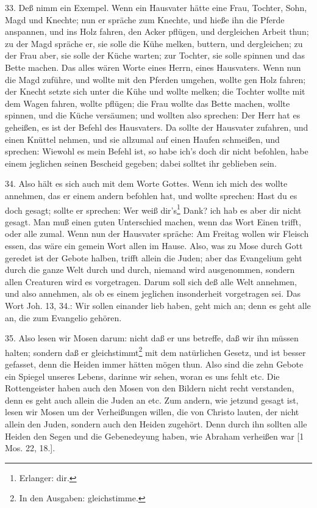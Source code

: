 33. Deß nimm ein Exempel. Wenn ein Hausvater hätte eine Frau, Tochter, Sohn, Magd und Knechte; nun er spräche zum Knechte, und hieße ihn die Pferde anspannen, und ins Holz fahren, den Acker pflügen, und dergleichen Arbeit thun; zu der Magd spräche er, sie solle die Kühe melken, buttern, und dergleichen; zu der Frau aber, sie solle der Küche warten; zur Tochter, sie solle spinnen und das Bette machen. Das alles wären Worte eines Herrn, eines Hausvaters. Wenn nun die Magd zuführe, und wollte mit den Pferden umgehen, wollte gen Holz fahren; der Knecht setzte sich unter die Kühe und wollte melken; die Tochter wollte mit dem Wagen fahren, wollte pflügen; die Frau wollte das Bette machen, wollte spinnen, und die Küche versäumen; und wollten also sprechen: Der Herr hat es geheißen, es ist der Befehl des Hausvaters. Da sollte der Hausvater zufahren, und einen Knüttel nehmen, und sie allzumal auf einen Haufen schmeißen, und sprechen: Wiewohl es mein Befehl ist, so habe ich’s doch dir nicht befohlen, habe einem jeglichen seinen Bescheid gegeben; dabei solltet ihr geblieben sein.

34. Also hält es sich auch mit dem Worte Gottes. Wenn ich mich des wollte annehmen, das er einem andern befohlen hat, und wollte sprechen: Hast du es doch gesagt; sollte er sprechen: Wer weiß dir’s\footnote{Erlanger: dir.} Dank? ich hab es aber dir nicht gesagt. Man muß einen guten Unterschied machen, wenn das Wort Einen trifft, oder alle zumal. Wenn nun der Hausvater spräche: Am Freitag wollen wir Fleisch essen, das wäre ein gemein Wort allen im Hause. Also, was zu Mose durch Gott geredet ist der Gebote halben, trifft allein die Juden; aber das Evangelium geht durch die ganze Welt durch und durch, niemand wird ausgenommen, sondern allen Creaturen wird es vorgetragen. Darum soll sich deß alle Welt annehmen, und also annehmen, als ob es einem jeglichen insonderheit vorgetragen sei. Das Wort Joh. 13, 34.: Wir sollen einander lieb haben, geht mich an; denn es geht alle an, die zum Evangelio gehören.

35. Also lesen wir Mosen darum: nicht daß er uns betreffe, daß wir ihn müssen halten; sondern daß er gleichstimmt\footnote{In den Ausgaben: gleichstimme.} mit dem natürlichen Gesetz, und ist besser gefasset, denn die Heiden immer hätten mögen thun. Also sind die zehn Gebote ein Spiegel unseres Lebens, darinne wir sehen, woran es uns fehlt etc. Die Rottengeister haben auch den Mosen von den Bildern nicht recht verstanden, denn es geht auch allein die Juden an etc. Zum andern, wie jetzund gesagt ist, lesen wir Mosen um der Verheißungen willen, die von Christo lauten, der nicht allein den Juden, sondern auch den Heiden zugehört. Denn durch ihn sollten alle Heiden den Segen und die Gebenedeyung haben, wie Abraham verheißen war [1 Mos. 22, 18.].

